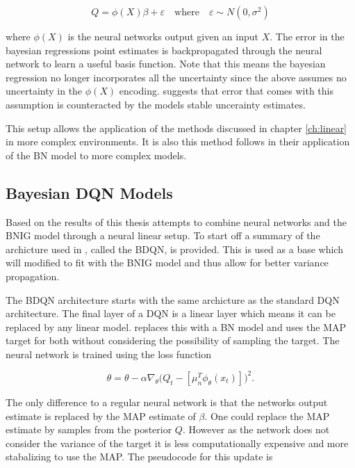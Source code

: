 \begin{equation*}
	Q = \phi(X)\beta + \varepsilon \quad \text{where} \quad \varepsilon \sim N(0,\sigma^2)
\end{equation*}

where $\phi(X)$ is the neural networks output given an input $X$. The error in the bayesian regressions point estimates is backpropagated through the neural network to learn a useful basis function. Note that this means the bayesian regression no longer incorporates all the uncertainty since the above assumes no uncertainty in the $\phi(X)$ encoding. \cite{carlos_2018} suggests that error that comes with this assumption is counteracted by the models stable uncerainty estimates.

This setup allows the application of the methods discussed in chapter \ref{ch:linear} in more complex environments. It is also this method \cite{azziz_2018} follows in their application of the BN model to more complex models.

\subsection{Bayesian DQN Models}

Based on the results of \cite{carlos_2018} this thesis attempts to combine neural networks and the BNIG model through a neural linear setup. To start off a summary of the archicture used in \cite{azziz_2018}, called the BDQN, is provided. This is used as a base which will modified to fit with the BNIG model and thus allow for better variance propagation.

The BDQN architecture starts with the same archicture as the standard DQN architecture\citep{mnih_2015}. The final layer of a DQN is a linear layer which means it can be replaced by any linear model. \cite{azziz_2018} replaces this with a BN model and uses the MAP target for both without considering the possibility of sampling the target. The neural network is trained using the loss function

\begin{equation*}
	\theta = \theta - \alpha\nabla_\theta\big(Q_t - [\mu_n^T\phi_\theta(x_t)]\big)^2.
\end{equation*}

 The only difference to a regular neural network is that the networks output estimate is replaced by the MAP estimate of $\beta$. One could replace the MAP estimate by samples from the posterior $Q$. However as the network does not consider the variance of the target it is less computationally expensive and more stabalizing to use the MAP. The pseudocode for this update is

